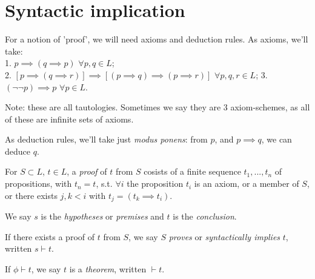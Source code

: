\documentclass[a4paper]{article}
\begin{document}
\newpage

\section{Syntactic implication}

For a notion of 'proof', we will need axioms and deduction rules. As axioms, we'll take:\\
1. $p \implies (q \implies p)$ $\forall p,q \in L$;\\
2. $[p\implies (q \implies r)] \implies [(p \implies q) \implies (p \implies r)]$ $\forall p,q,r \in L$;
3. $(\neg\neg p) \implies p$ $\forall p \in L$.

Note: these are all tautologies. Sometimes we say they are 3 axiom-schemes, as all of these are infinite sets of axioms.

As deduction rules, we'll take just \emph{modus ponens}: from $p$, and $p\implies q$, we can deduce $q$.

For $S \subset L$, $t \in L$, a \emph{proof} of $t$ from $S$ cosists of a finite sequence $t_1,...,t_n$ of propositions, with $t_n = t$, s.t. $\forall i$ the proposition $t_i$ is an axiom, or a member of $S$, or there exists $j,k < i$ with $t_j=(t_k \implies t_i)$.

We say $s$ is the \emph{hypotheses} or \emph{premises} and $t$ is the \emph{conclusion}.

If there exists a proof of $t$ from $S$, we say $S$ \emph{proves} or \emph{syntactically implies} $t$, written $s \vdash t$.

If $\phi \vdash t$, we say $t$ is a \emph{theorem}, written $\vdash t$.

\iffalse
\begin{equation*}
\begin{aligned}

\end{aligned}
\end{equation*}
\fi
\end{document}
